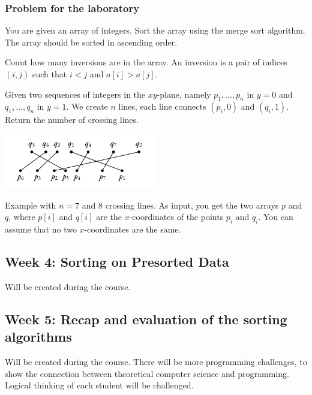 \documentclass[10pt, oneside]{article}
\theoremstyle{remark}
\begin{document}
\subsubsection*{Problem for the laboratory}
\begin{tcolorbox}
  You are given an array of integers. Sort the array using the merge sort algorithm. The array should be sorted in ascending order. 

  \vspace{1em}
  
  Count how many inversions are in the array. An inversion is a pair of indices $(i, j)$ such that $i < j$ and $a[i] > a[j]$.

  \vspace{1em}

  Given two sequences of integers in the $xy$-plane, namely $p_1, \dots, p_n$ in $y=0$ and $q_1, \dots, q_n$ in $y=1$. We create $n$ lines, each line connects $(p_i, 0)$ and $(q_i, 1)$. Return the number of crossing lines.
  \begin{center}
    \includegraphics[width=0.5\textwidth]{MergeSortProblem.png}
  \end{center}
  Example with $n=7$ and $8$ crossing lines. As input, you get the two arrays $p$ and $q$, where $p[i]$ and $q[i]$ are the $x$-coordinates of the points $p_i$ and $q_i$. You can assume that no two $x$-coordinates are the same.
    

\end{tcolorbox}

\subsection{Week 4: Sorting on Presorted Data}
Will be created during the course.

\subsection{Week 5: Recap and evaluation of the sorting algorithms}
Will be created during the course. There will be more programming challenges, to show the connection between theoretical computer science and programming. Logical thinking of each student will be challenged.
\end{document}
